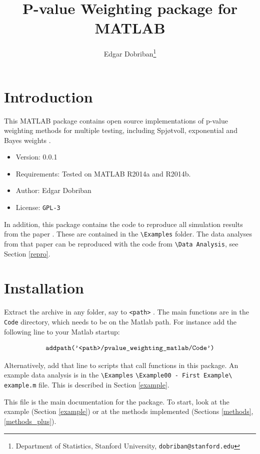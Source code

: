 \documentclass[english,11pt]{article} %
\title{P-value Weighting package for MATLAB}
\author{Edgar Dobriban\thanks{Department of Statistics, Stanford University, \texttt{dobriban@stanford.edu}} }
\begin{document}
\maketitle
\tableofcontents
\section{Introduction}

This MATLAB package contains open source implementations of p-value weighting methods for multiple testing, including Spj\o tvoll, exponential and Bayes weights \citep[proposed in][]{dobriban2015optimal}. %

\begin{itemize}
\item{Version: } 0.0.1
\item{Requirements: } Tested on MATLAB R2014a and R2014b. 
\item{Author: } Edgar Dobriban
\item{License: } \verb+GPL-3+
\end{itemize}

In addition, this package contains the code to reproduce all simulation results from the paper \cite{dobriban2015optimal}. These are contained in the \verb+\Examples+ folder. The data analyses from that paper can be reproduced with the code from \verb+\Data Analysis+, see Section \ref{repro}. 

\section{Installation}

Extract the archive in any folder, say to \verb+<path>+ . The main functions are in the \verb+Code+ directory, which needs to be on the Matlab path. For instance add the following line to your Matlab startup:

$$\verb+addpath('<path>/pvalue_weighting_matlab/Code')+$$

Alternatively,  add that line to scripts that call functions in this package. An example data analysis is in the \verb+\Examples+ \verb+\Example00 - First Example\+ \verb+example.m+ file. This is described in Section \ref{example}.

This file is the main documentation for the package. To start, look at the example (Section \ref{example}) or at the methods implemented (Sections \ref{methods}, \ref{methods_plus}).
\end{document}
